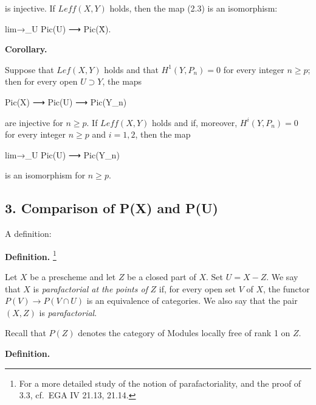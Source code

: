 \documentclass[
]{article}
\newenvironment{Shaded}{}{}
\newcommand{\NormalTok}[1]{#1}
\begin{document}
is injective. If \(Leff(X, Y)\) holds, then the map (2.3) is an
isomorphism:

\begin{Shaded}
\begin{Highlighting}[]
\NormalTok{lim→\_U Pic(U) ⟶ Pic(X̂).}
\end{Highlighting}
\end{Shaded}

\textbf{Corollary.}

Suppose that \(Lef(X, Y)\) holds and that \(H^{1}(Y, P_{n}) = 0\) for
every integer \(n \geqslant p\); then for every open \(U \supset Y\),
the maps

\begin{Shaded}
\begin{Highlighting}[]
\NormalTok{Pic(X) ⟶ Pic(U) ⟶ Pic(Y\_n)}
\end{Highlighting}
\end{Shaded}

are injective for \(n \geqslant p\). If \(Leff(X, Y)\) holds and if,
moreover, \(H^{i}(Y, P_{n}) = 0\) for every integer \(n \geqslant p\)
and \(i = 1, 2\), then the map

\begin{Shaded}
\begin{Highlighting}[]
\NormalTok{lim→\_U Pic(U) ⟶ Pic(Y\_n)}
\end{Highlighting}
\end{Shaded}

is an isomorphism for \(n \geqslant p\).

\subsection{3. Comparison of P(X) and
P(U)}\label{comparison-of-px-and-pu}

A definition:

\textbf{Definition.} \footnote{For a more detailed study of the notion
  of parafactoriality, and the proof of 3.3, cf.~EGA IV 21.13, 21.14.}

Let \(X\) be a prescheme and let \(Z\) be a closed part of \(X\). Set
\(U = X - Z\). We say that \(X\) is \emph{parafactorial at the points
of} \(Z\) if, for every open set \(V\) of \(X\), the functor
\(P(V) \to P(V \cap U)\) is an equivalence of categories. We also say
that the pair \((X, Z)\) is \emph{parafactorial}.

Recall that \(P(Z)\) denotes the category of Modules locally free of
rank 1 on \(Z\).

\textbf{Definition.}
\end{document}
